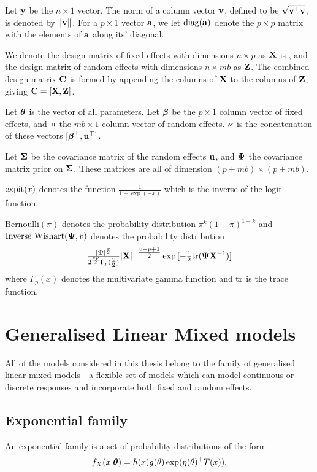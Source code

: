 \documentclass{amsart}[12pt]
\begin{document}
Let ${\bf y}$ be the $n \times 1$ vector. The norm of a column vector ${\bf v}$, defined to be $\sqrt{{\bf v}^\top {\bf v}}$,
is  denoted by $\|{\bf v}\|$. For a $p \times 1$ vector ${\bf a}$, we let $\text{diag}{({\bf a})}$ denote the $p \times p$
matrix with the elements of ${\bf a}$ along its' diagonal.

We denote the design matrix of fixed effects with dimensions $n \times p$ as ${\bf X}$ is , and the design matrix
of random  effects with dimensions $n \times m b$ as ${\bf Z}$. The combined design matrix ${\bf C}$ is formed by
appending the columns of ${\bf X}$ to the columns of ${\bf Z}$, giving ${\bf C} = [ {\bf X}, {\bf Z} ]$.

Let ${\boldsymbol \theta}$ is the vector of all parameters.
Let ${\boldsymbol \beta}$ be the $p \times 1$ column vector of fixed
effects, and ${\bf u}$ the $m b \times 1$ column vector of random effects. ${\boldsymbol \nu}$ is the
concatenation of these vectors $[{\boldsymbol \beta}^\top, {\bf u}^\top]$.

Let ${\boldsymbol \Sigma}$ be the covariance matrix of the random effects ${\bf u}$,
and 
${\boldsymbol \Psi}$ the covariance matrix prior on ${\boldsymbol \Sigma}$.
These matrices are all of dimension $(p + m b) \times (p + m b)$.


$\text{expit} (x)$ denotes the function $\tfrac{1}{1 + \exp(-x)}$ which is the inverse of the logit
function.

$\text{Bernoulli}(\pi)$ denotes the probability distribution $\pi^k (1 - \pi)^{1-k}$ and
$\text{Inverse Wishart}({\boldsymbol \Psi}, v)$ denotes the probability distribution
$$\tfrac{|{\boldsymbol \Psi}|^\frac{v}{2}}{2^{\frac{vp}{2}} \Gamma_p{(\tfrac{v}{2})}} |{\bf X}|^{-\tfrac{v + p + 1}{2}}
\exp{[- \tfrac{1}{2} \text{tr}{({\boldsymbol\Psi}{\bf X}^{-1})}]}$$ where $\Gamma_p{(x)}$ denotes the multivariate gamma function and $\text{tr}$
is the trace function.

\section{Generalised Linear Mixed models}
All of the models considered in this thesis belong to the family of generalised linear mixed models - a
flexible set of models which can model continuous or discrete responses and incorporate both fixed and
random effects.

\subsection{Exponential family}

An exponential family is a set of probability distributions of the form
\[
	f_X(x|{\boldsymbol \theta}) = h(x) g(\theta) \exp(\eta(\theta)^\top T(x)).
\]
\end{document}

